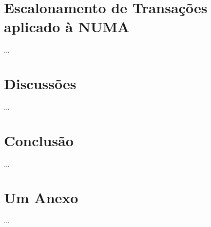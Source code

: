 \documentclass[ti]{texufpel} %
\begin{document}
\chapter{Escalonamento de Transações aplicado à NUMA}

  ...


\chapter{Discussões}

  ...


\chapter{Conclusão}

  ...





\annex
\chapter{Um Anexo}

  ...
\end{document}
